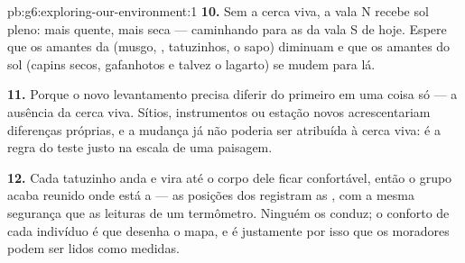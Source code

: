 \begin{solution}{pb:g6:exploring-our-environment:1}
\textbf{10.} Sem a cerca viva, a vala N recebe sol pleno: mais
quente, mais seca ---  caminhando para as da vala S de hoje.
Espere que os amantes da  (musgo, , tatuzinhos, o
sapo) diminuam e que os amantes do sol (capins secos, gafanhotos e
talvez o lagarto) se mudem para lá.

\textbf{11.} Porque o novo levantamento precisa diferir do primeiro
em uma coisa só --- a ausência da cerca viva. Sítios, instrumentos ou
estação novos acrescentariam diferenças próprias, e a mudança já não
poderia ser atribuída à cerca viva: é a regra do teste justo na
escala de uma paisagem.

\textbf{12.} Cada tatuzinho anda e vira até o corpo dele ficar
confortável, então o grupo acaba reunido onde está a  --- as
posições dos  registram as , com a mesma segurança
que as leituras de um termômetro. Ninguém os conduz; o conforto de
cada indivíduo é que desenha o mapa, e é justamente por isso que os
moradores podem ser lidos como medidas.
\end{solution}
